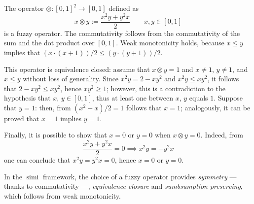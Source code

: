 \documentclass{llncs}
\DeclareMathOperator{\simi}{simi}
\begin{document}
  \begin{example}
    The operator \(\otimes \colon {[0,1]}^2 \to [0,1]\) defined as
    \[
    x \otimes y := \frac{x^2y + y^2x}{2} \qquad x,y \in [0,1]
    \]
    is a fuzzy operator.
    The commutativity follows from the commutativity of the sum and the dot product over \([0,1]\). Weak monotonicity holds, because \(x \le y\) implies that \((x \cdot (x+1))/2 \le (y \cdot (y+1))/2\).

    This operator is equivalence closed: assume that \(x \otimes y = 1\) and \(x \ne 1\), \(y \ne 1\), and \(x \le y\) without loss of generality.
    Since \(x^2y = 2 - xy^2\) and \(x^2y \le xy^2\), it follows that \(2-xy^2 \le xy^2\), hence \(xy^2 \ge 1\); however, this is a contradiction to the hypothesis that \(x\), \(y \in [0,1]\), thus at least one between \(x\), \(y\) equals \(1\).
    Suppose that \(y = 1\): then, from \((x^2 + x)/2 = 1\) follows that \(x = 1\); analogously, it can be proved that \(x = 1\) implies \(y = 1\).

    Finally, it is possible to show that \(x = 0\) or \(y = 0\) when \(x \otimes y = 0\).
    Indeed, from
    \[
    \frac{x^2y + y^2x}{2} = 0 \implies x^2y = - y^2x
    \]
    one can conclude that \(x^2y = y^2x = 0\), hence \(x = 0\) or \(y = 0\).
  \end{example}
  In the \(\simi{}\) framework, the choice of a fuzzy operator provides \emph{symmetry} --- thanks to commutativity ---, \emph{equivalence closure} and \emph{sumbsumption preserving}, which follows from weak monotonicity.
\end{document}
